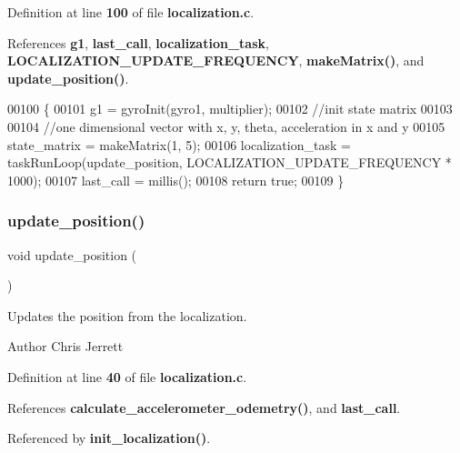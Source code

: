 Definition at line \textbf{ 100} of file \textbf{ localization.\+c}.



References \textbf{ g1}, \textbf{ last\+\_\+call}, \textbf{ localization\+\_\+task}, \textbf{ L\+O\+C\+A\+L\+I\+Z\+A\+T\+I\+O\+N\+\_\+\+U\+P\+D\+A\+T\+E\+\_\+\+F\+R\+E\+Q\+U\+E\+N\+CY}, \textbf{ make\+Matrix()}, and \textbf{ update\+\_\+position()}.


\begin{DoxyCode}
00100                                                                                                            
                    \{
00101   g1 = gyroInit(gyro1, multiplier);
00102   \textcolor{comment}{//init state matrix}
00103 
00104   \textcolor{comment}{//one dimensional vector with x, y, theta, acceleration in x and y}
00105   state_matrix = makeMatrix(1, 5);
00106   localization_task = taskRunLoop(update_position, LOCALIZATION_UPDATE_FREQUENCY * 1000);
00107   last_call = millis();
00108   \textcolor{keywordflow}{return} \textcolor{keyword}{true};
00109 \}
\end{DoxyCode}
\mbox{\label{localization_8h_afacd5e0b3d5e677df26a4402bbd9ec9e}} 
\subsubsection{update\+\_\+position()}
{\footnotesize\ttfamily void update\+\_\+position (\begin{DoxyParamCaption}{ }\end{DoxyParamCaption})}



Updates the position from the localization. 

\begin{DoxyAuthor}{Author}
Chris Jerrett 
\end{DoxyAuthor}


Definition at line \textbf{ 40} of file \textbf{ localization.\+c}.



References \textbf{ calculate\+\_\+accelerometer\+\_\+odemetry()}, and \textbf{ last\+\_\+call}.



Referenced by \textbf{ init\+\_\+localization()}.


